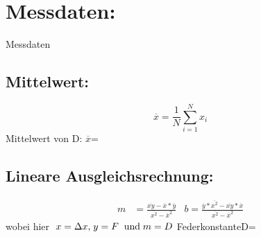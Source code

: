 \section{Messdaten:} 
    
\begin{table}
    \centering
     
    \caption{Messdaten}
    \label{tab:data}
\end{table}
    \subsection{Mittelwert:}
    \begin{equation}\label{eq.mean}
        \overline{x} = \frac{1}{N}\sum\limits_{i=1}^{N} x_i
    \end{equation}
    Mittelwert von D: $\overline{x}$\:=\:

    \subsection{Lineare Ausgleichsrechnung:}
    \begin{align}\label{eq.linreg}
        m &= \frac{\overline{xy}-\overline{x}* \overline{y}}{\overline{x^2}-\overline{x}^2} 
        &b = \frac{\overline{y}* \overline{x^2}-\overline{xy}* \overline{x}}{\overline{x^2}- \overline{x}^2}
    \end{align}
    wobei hier $\; x = \Delta x \text{,} \; y=F \;\;\text{und}\; m = D \\$
    Federkonstante\:D\:=\:

    
    


